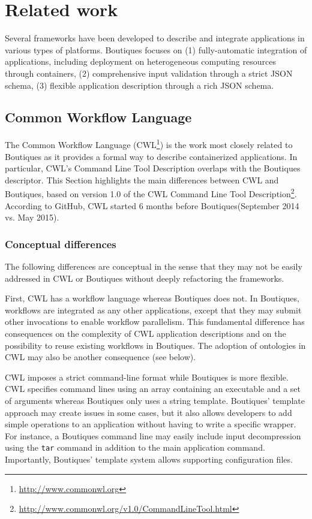 \documentclass[a4paper,num-refs]{oup-contemporary}
\newcommand{\boutiques}{Boutiques\xspace}
\begin{document}

\section{Related work}

Several frameworks have been developed to describe and integrate
applications in various types of platforms. \boutiques focuses on (1)
fully-automatic integration of applications, including deployment on
heterogeneous computing resources through containers, (2)
comprehensive input validation through a strict JSON schema, (3)
flexible application description through a rich JSON
schema.

\subsection{Common Workflow Language}

The Common Workflow Language
(CWL\footnote{\url{http://www.commonwl.org}}) is the work most closely
related to \boutiques as it provides a formal way to describe
containerized applications. In particular, CWL's Command Line Tool
Description overlaps with the \boutiques descriptor. This Section
highlights the main differences between CWL and \boutiques, based on
version 1.0 of the CWL Command Line Tool
Description\footnote{\url{http://www.commonwl.org/v1.0/CommandLineTool.html}}. According
to GitHub, CWL started 6 months before \boutiques (September 2014
vs. May 2015).

\subsubsection{Conceptual differences}

The following differences are conceptual in the sense that they may
not be easily addressed in CWL or \boutiques without deeply
refactoring the frameworks.

First, CWL has a workflow language whereas \boutiques does not. In
\boutiques, workflows are integrated as any other applications, except
that they may submit other invocations to enable workflow
parallelism. This fundamental difference has consequences on the
complexity of CWL application descriptions and on the possibility to
reuse existing workflows in \boutiques. The adoption of ontologies in
CWL may also be another consequence (see below).

CWL imposes a strict command-line format while \boutiques is more
flexible. CWL specifies command lines using an array containing an
executable and a set of arguments whereas \boutiques only uses a
string template. \boutiques' template approach may create issues in
some cases, but it also allows developers to add simple operations to
an application without having to write a specific wrapper. For
instance, a \boutiques command line may easily include input
decompression using the \texttt{tar} command in addition to the main
application command. Importantly, \boutiques' template system allows
supporting configuration files.
\end{document}
